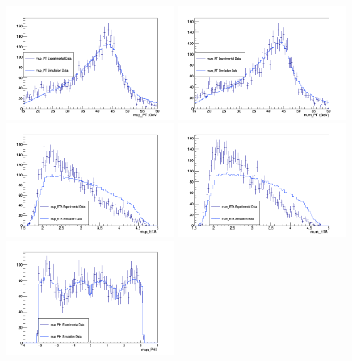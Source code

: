 \documentclass[a4paper]{article}
\begin{document}
\begin{figure}[bt]
\centering
\includegraphics[clip, trim = 0.5cm 0cm 1.7cm 1.3cm, width=0.49\textwidth]{Measurement_mup_PT.png}
\includegraphics[clip, trim = 0.5cm 0cm 1.7cm 1.3cm, width=0.49\textwidth]{Measurement_mum_PT.png}
\includegraphics[clip, trim = 0.5cm 0cm 1.7cm 1.3cm, width=0.49\textwidth]{Measurement_mup_ETA.png}
\includegraphics[clip, trim = 0.5cm 0cm 1.7cm 1.3cm, width=0.49\textwidth]{Measurement_mum_ETA.png}
\includegraphics[width=0.49\textwidth]{Measurement_mup_PHI.png}

\end{figure}
\end{document}
